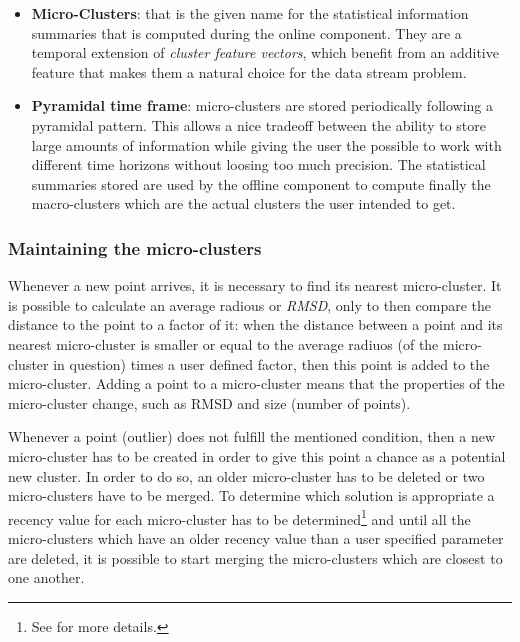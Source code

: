 \begin{itemize}
 \item \textbf{Micro-Clusters}: that is the given name for the statistical information summaries that is computed during the online component. They are a temporal extension of \textit{cluster feature vectors}\cite{zhang96birch}, which benefit from an additive feature that makes them a natural choice for the data stream problem\cite{clustreamOrig}.
 
 \item \textbf{Pyramidal time frame}: micro-clusters are stored periodically following a pyramidal pattern. This allows a nice tradeoff between the ability to store large amounts of information while giving the user the possible to work with different time horizons without loosing too much precision. The statistical summaries stored are used by the offline component to compute finally the macro-clusters which are the actual clusters the user intended to get.
\end{itemize}


\subsubsection{Maintaining the micro-clusters}

Whenever a new point arrives, it is necessary to find its nearest micro-cluster. It is possible to calculate an average radious or \textit{RMSD}, only to then compare the distance to the point to a factor of it: when the distance between a point and its nearest micro-cluster is smaller or equal to the average radiuos (of the micro-cluster in question) times a user defined factor, then this point is added to the micro-cluster. Adding a point to a micro-cluster means that the properties of the micro-cluster change, such as RMSD and size (number of points).

Whenever a point (outlier) does not fulfill the mentioned condition, then a new micro-cluster has to be created in order to give this point a chance as a potential new cluster. In order to do so, an older micro-cluster has to be deleted or two micro-clusters have to be merged. To determine which solution is appropriate a recency value for each micro-cluster has to be determined\footnote{See \cite{clustreamOrig} for more details.} and until all the micro-clusters which have an older recency value than a user specified parameter are deleted, it is possible to start merging the micro-clusters which are closest to one another.

